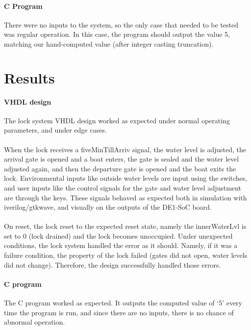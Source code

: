 \documentclass{article}
\begin{document}
      \paragraph{C Program} There were no inputs to the system, so the only case that needed to be tested was regular operation. In this case, the program should output the value 5, matching our hand-computed value (after integer casting truncation).


\section{Results}
  \paragraph{VHDL design} The lock system VHDL design worked as expected under normal operating parameters, and under edge cases.

  \paragraph{} When the lock receives a fiveMinTillArriv signal, the water level is adjusted, the arrival gate is opened and a boat enters, the gate is sealed and the water level adjusted again, and then the departure gate is opened and the boat exits the lock. Environmental inputs like outside water levels are input using the switches, and user inputs like the control signals for the gate and water level adjustment are through the keys. These signals behaved as expected both in simulation with iverilog/gtkwave, and visually on the outputs of the DE1-SoC board.

  \paragraph{} On reset, the lock reset to the expected reset state, namely the innerWaterLvl is set to 0 (lock drained) and the lock becomes unoccupied. Under unexpected conditions, the lock system handled the error as it should. Namely, if it was a failure condition, the property of the lock failed (gates did not open, water levels did not change). Therefore, the design successfully handled those errors.

  \paragraph{C program} The C program worked as expected. It outputs the computed value of ‘5’ every time the program is run, and since there are no inputs, there is no chance of abnormal operation.
\end{document}
